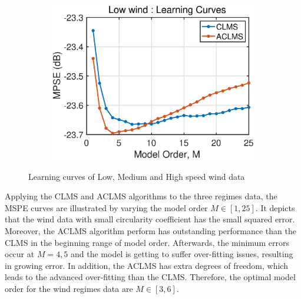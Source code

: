 \begin{figure}[htp]
\begin{subfigure}[b]{0.3\textwidth}
     \centering
     \includegraphics[width=1.2\textwidth]{fig/31/31b6.eps}
    \end{subfigure}  
    \caption{Learning curves of Low, Medium and High speed wind data}
    \label{fig:3_1_b2}
\end{figure}
Applying the CLMS and ACLMS algorithms to the three regimes data, the MSPE curves are illustrated by varying the model order $M\in[1,25]$. It depicts that the wind data with small circularity coefficient has the small squared error. Moreover, the ACLMS algorithm perform has outstanding performance than the CLMS in the beginning range of model order. Afterwards, the minimum errors occur at $M=4,5$ and the model is getting to suffer over-fitting issues, resulting in growing error. In addition, the ACLMS has extra degrees of freedom, which leads to the advanced over-fitting than the CLMS. Therefore, the optimal model order for the wind regimes data are $M\in[3,6]$.
